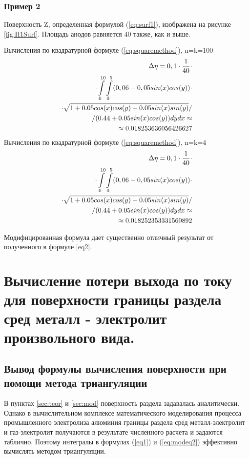 \documentclass{article}
\begin{document}
\subsubsection*{Пример 2}

Поверхность Z, определенная формулой (\ref{eq:surf1}), изображена на рисунке \ref{fig:H1Surf}. Площадь анодов равняется $40$ также, как и выше.

Вычисления по квадратурной формуле (\ref{eq:squaremethod}), n=k=100
\begin{align}
\Delta \eta = 0,1 \cdot \frac{1}{40} \cdot \notag \\
\cdot \int\limits_0^{10} \int\limits_0^5 (0,06 - 0,05sin(x)cos(y)) \cdot \notag \\
\cdot \sqrt{1+0.05cos(x)cos(y)-0.05sin(x)sin(y)}/ \notag \\
/(0.44 + 0.05sin(x)cos(y)) dy dx \approx \notag \\ \approx 0.018253636056426627
\end{align}
Вычисления по квадратурной формуле (\ref{eq:squaremethod}), n=k=4
\begin{align}
\Delta \eta = 0,1 \cdot \frac{1}{40} \cdot \notag \\
\cdot \int\limits_0^{10} \int\limits_0^5 (0,06 - 0,05sin(x)cos(y)) \cdot \notag \\
\cdot \sqrt{1+0.05cos(x)cos(y)-0.05sin(x)sin(y)}/ \notag \\
/(0.44 + 0.05sin(x)cos(y)) dy dx \approx \notag \\ \approx 0.018252353331560892
\end{align}

Модифицированная формула дает существенно отличный результат от полученного в формуле \ref{eq2}.

\section{Вычисление потери выхода по току для поверхности границы раздела сред металл - электролит произвольного вида.}
\subsection{Вывод формулы вычисления поверхности при помощи метода триангуляции}

В пунктах \ref{sec:teor} и \ref{sec:mod} поверхность раздела задавалась аналитически. Однако в вычислительном комплексе математического моделирования процесса промышленного электролиза алюминия границы раздела сред металл-электролит и газ-электролит получаются в результате численного расчета и задаются таблично. Поэтому интегралы в формулах (\ref{eq1}) и (\ref{eq:modeq2}) эффективно вычислять методом триангуляции.
\end{document}
